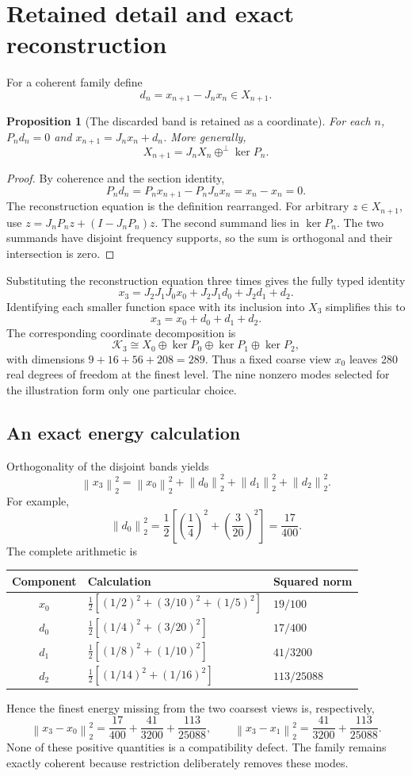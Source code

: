\documentclass[11pt]{article}
\newtheorem{proposition}[theorem]{Proposition}
\theoremstyle{definition}
\theoremstyle{remark}
\newcommand{\K}{\mathcal K}
\newcommand{\norm}[1]{\left\lVert #1\right\rVert}
\begin{document}
\section{Retained detail and exact reconstruction}
\label{sec:details}
For a coherent family define
\[
 d_n=x_{n+1}-J_nx_n\in X_{n+1}.
\]
\begin{proposition}[The discarded band is retained as a coordinate]
For each $n$, $P_nd_n=0$ and $x_{n+1}=J_nx_n+d_n$. More generally,
\[
 X_{n+1}=J_nX_n\mathbin{\oplus^{\perp}}\ker P_n.
\]
\end{proposition}
\begin{proof}
By coherence and the section identity,
\[
 P_nd_n=P_nx_{n+1}-P_nJ_nx_n=x_n-x_n=0.
\]
The reconstruction equation is the definition rearranged. For arbitrary $z\in X_{n+1}$, use $z=J_nP_nz+(I-J_nP_n)z$. The second summand lies in $\ker P_n$. The two summands have disjoint frequency supports, so the sum is orthogonal and their intersection is zero.
\end{proof}

Substituting the reconstruction equation three times gives the fully typed identity
\[
 x_3=J_2J_1J_0x_0+J_2J_1d_0+J_2d_1+d_2.
\]
Identifying each smaller function space with its inclusion into $X_3$ simplifies this to
\[
 \boxed{x_3=x_0+d_0+d_1+d_2.}
\]
The corresponding coordinate decomposition is
\[
 \K_3\cong X_0\oplus\ker P_0\oplus\ker P_1\oplus\ker P_2,
\]
with dimensions $9+16+56+208=289$. Thus a fixed coarse view $x_0$ leaves 280 real degrees of freedom at the finest level. The nine nonzero modes selected for the illustration form only one particular choice.

\subsection{An exact energy calculation}
Orthogonality of the disjoint bands yields
\[
 \norm{x_3}_2^2=\norm{x_0}_2^2+
 \norm{d_0}_2^2+\norm{d_1}_2^2+\norm{d_2}_2^2.
\]
For example,
\[
 \norm{d_0}_2^2=\frac12\left[\left(\frac14\right)^2+
 \left(\frac3{20}\right)^2\right]=\frac{17}{400}.
\]
The complete arithmetic is
\begin{center}
\begin{tabular}{@{}cll@{}}
\toprule
Component & Calculation & Squared norm\\
\midrule
$x_0$ & $\tfrac12[(1/2)^2+(3/10)^2+(1/5)^2]$ & $19/100$\\[2pt]
$d_0$ & $\tfrac12[(1/4)^2+(3/20)^2]$ & $17/400$\\[2pt]
$d_1$ & $\tfrac12[(1/8)^2+(1/10)^2]$ & $41/3200$\\[2pt]
$d_2$ & $\tfrac12[(1/14)^2+(1/16)^2]$ & $113/25088$\\
\bottomrule
\end{tabular}
\end{center}
Hence the finest energy missing from the two coarsest views is, respectively,
\[
 \norm{x_3-x_0}_2^2=\frac{17}{400}+\frac{41}{3200}+\frac{113}{25088},
 \qquad
 \norm{x_3-x_1}_2^2=\frac{41}{3200}+\frac{113}{25088}.
\]
None of these positive quantities is a compatibility defect. The family remains exactly coherent because restriction deliberately removes these modes.
\end{document}
